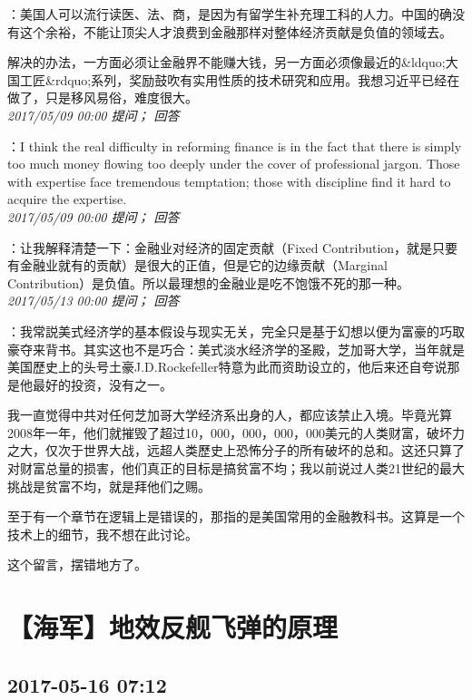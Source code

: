 \documentclass[twocolumn]{ctexart}
\begin{document}
：美国人可以流行读医、法、商，是因为有留学生补充理工科的人力。中国的确没有这个余裕，不能让顶尖人才浪费到金融那样对整体经济贡献是负值的领域去。

解决的办法，一方面必须让金融界不能赚大钱，另一方面必须像最近的\&ldquo;大国工匠\&rdquo;系列，奖励鼓吹有实用性质的技术研究和应用。我想习近平已经在做了，只是移风易俗，难度很大。\\

\textit{\hfill\noindent\small 2017/05/09 00:00 提问； 回答}

：I think the real difficulty in reforming finance is in the fact that there is simply too much money flowing too deeply under the cover of professional jargon. Those with expertise face tremendous temptation; those with discipline find it hard to acquire the expertise.\\

\textit{\hfill\noindent\small 2017/05/09 00:00 提问； 回答}

：让我解释清楚一下：金融业对经济的固定贡献（Fixed Contribution，就是只要有金融业就有的贡献）是很大的正值，但是它的边缘贡献（Marginal Contribution）是负值。所以最理想的金融业是吃不饱饿不死的那一种。\\

\textit{\hfill\noindent\small 2017/05/13 00:00 提问； 回答}

：我常説美式经济学的基本假设与现实无关，完全只是基于幻想以便为富豪的巧取豪夺来背书。其实这也不是巧合：美式淡水经济学的圣殿，芝加哥大学，当年就是美国歷史上的头号土豪J.D.Rockefeller特意为此而资助设立的，他后来还自夸说那是他最好的投资，没有之一。

我一直觉得中共对任何芝加哥大学经济系出身的人，都应该禁止入境。毕竟光算2008年一年，他们就摧毁了超过10，000，000，000，000美元的人类财富，破坏力之大，仅次于世界大战，远超人类歷史上恐怖分子的所有破坏的总和。这还只算了对财富总量的损害，他们真正的目标是搞贫富不均；我以前说过人类21世纪的最大挑战是贫富不均，就是拜他们之赐。

至于有一个章节在逻辑上是错误的，那指的是美国常用的金融教科书。这算是一个技术上的细节，我不想在此讨论。

这个留言，摆错地方了。\\


\section{【海军】地效反舰飞弹的原理}
\subsection{2017-05-16 07:12}
\end{document}
